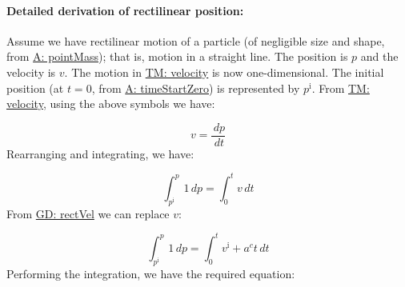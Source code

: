 \documentclass[12pt]{article}
\begin{document}
\paragraph{Detailed derivation of rectilinear position:}
\label{GD:rectPosDeriv}
Assume we have rectilinear motion of a particle (of negligible size and shape, from \hyperref[pointMass]{A: pointMass}); that is, motion in a straight line. The position is $p$ and the velocity is $v$. The motion in \hyperref[TM:velocity]{TM: velocity} is now one-dimensional. The initial position (at $t=0$, from \hyperref[timeStartZero]{A: timeStartZero}) is represented by ${p^{\text{i}}}$. From \hyperref[TM:velocity]{TM: velocity}, using the above symbols we have:

\begin{displaymath}
v=\frac{\,dp}{\,dt}
\end{displaymath}
Rearranging and integrating, we have:

\begin{displaymath}
\int_{{p^{\text{i}}}}^{p}{1}\,dp=\int_{0}^{t}{v}\,dt
\end{displaymath}
From \hyperref[GD:rectVel]{GD: rectVel} we can replace $v$:

\begin{displaymath}
\int_{{p^{\text{i}}}}^{p}{1}\,dp=\int_{0}^{t}{{v^{\text{i}}}+{a^{c}} t}\,dt
\end{displaymath}
Performing the integration, we have the required equation:
\end{document}

